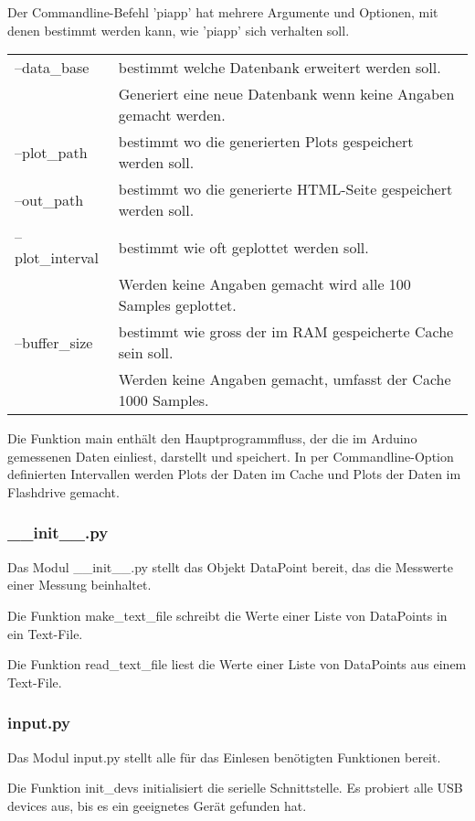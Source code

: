 \documentclass{article}
\begin{document}
Der Commandline-Befehl 'piapp' hat mehrere Argumente und Optionen, mit denen bestimmt werden kann, wie 'piapp' sich verhalten soll.

\begin{tabular}{l l}
--data\_base     & bestimmt welche Datenbank erweitert werden soll. \\
~                & Generiert eine neue Datenbank wenn keine Angaben gemacht werden. \\
--plot\_path     & bestimmt wo die generierten Plots gespeichert werden soll. \\
--out\_path      & bestimmt wo die generierte HTML-Seite gespeichert werden soll. \\
--plot\_interval & bestimmt wie oft geplottet werden soll. \\
~                & Werden keine Angaben gemacht wird alle 100 Samples geplottet. \\
--buffer\_size   & bestimmt wie gross der im RAM gespeicherte Cache sein soll. \\
~                & Werden keine Angaben gemacht, umfasst der Cache 1000 Samples. 
\end{tabular}

Die Funktion main enthält den Hauptprogrammfluss, der die im Arduino gemessenen Daten einliest, darstellt und speichert.
In per Commandline-Option definierten Intervallen werden Plots der Daten im Cache und Plots der Daten im Flashdrive gemacht.

\subsubsection{\_\_init\_\_.py}
Das Modul \_\_init\_\_.py stellt das Objekt DataPoint bereit, das die Messwerte einer Messung beinhaltet.

Die Funktion make\_text\_file schreibt die Werte einer Liste von DataPoints in ein Text-File.

Die Funktion read\_text\_file liest die Werte einer Liste von DataPoints aus einem Text-File.

\subsubsection{input.py}
Das Modul input.py stellt alle für das Einlesen benötigten Funktionen bereit.

Die Funktion init\_devs initialisiert die serielle Schnittstelle.
Es probiert alle USB devices aus, bis es ein geeignetes Gerät gefunden hat.
\end{document}
